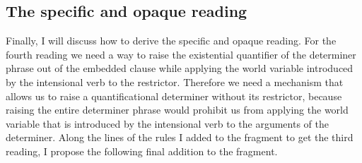 \documentclass[parskip=half]{scrartcl}
\begin{document}
\normalsize








\pagebreak

\subsection{The specific and opaque reading}

Finally, I will discuss how to derive the specific and opaque reading. For the fourth reading we need a way to raise the existential quantifier of the determiner phrase out of the embedded clause
while applying the world variable introduced by the intensional verb to the restrictor. Therefore we need a mechanism that allows us to raise a quantificational determiner without its restrictor, because
raising the entire determiner phrase would prohibit us from applying the world variable that is introduced by the intensional verb to the arguments of the determiner.
Along the lines of the rules I added to the fragment to get the third reading, I propose the following final addition to the fragment.
\end{document}
